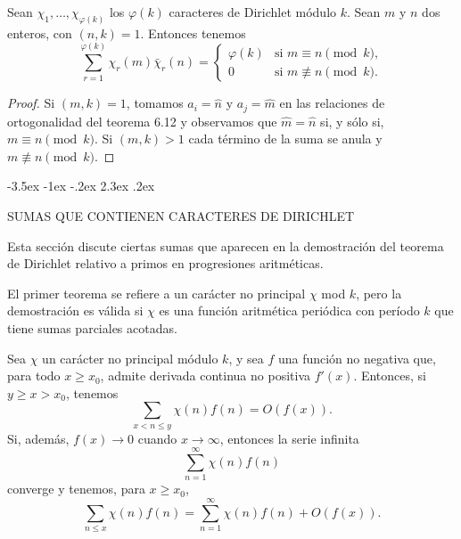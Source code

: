 \documentclass[12pt,a4paper]{book}
\makeatletter
\renewcommand\section{\@startsection{section}{1}{\z@}%
  {-3.5ex \@plus -1ex \@minus -.2ex}%
  {2.3ex \@plus .2ex}%
  {\normalfont\Large\bfseries\raggedright}}
\makeatother
\begin{document}
    \begin{teorema}
        Sean $\chi_{1},\dots,\chi_{\varphi(k)}$ los $\varphi(k)$ caracteres de Dirichlet
        módulo $k$. Sean $m$ y $n$ dos enteros, con $(n,k)=1$. Entonces tenemos
        \begin{equation*}
            \sum_{r=1}^{\varphi(k)}\chi_{r}(m)\bar{\chi}_{r}(n)=
            \begin{cases}
                \varphi(k)&\text{si }m\equiv n\pmod{k},\\
                0&\text{si }m\not\equiv n\pmod{k}.
            \end{cases}
        \end{equation*}
    \end{teorema}

    \begin{proof}
        Si $(m,k)=1$, tomamos $a_{i}=\hat{n}$ y $a_{j}=\hat{m}$ en las relaciones de
        ortogonalidad del teorema 6.12 y observamos que $\hat{m}=\hat{n}$ si, y sólo si,
        $m\equiv n\pmod{k}$. Si $(m,k)>1$ cada término de la suma se anula y
        $m\not\equiv n\pmod{k}$.
    \end{proof}

    \section{SUMAS QUE CONTIENEN CARACTERES DE DIRICHLET}

    Esta sección discute ciertas sumas que aparecen en la demostración del teorema de
    Dirichlet relativo a primos en progresiones aritméticas.

    El primer teorema se refiere a un carácter no principal $\chi$ mod $k$, pero la
    demostración es válida si $\chi$ es una función aritmética periódica con período $k$
    que tiene sumas parciales acotadas.

    \begin{teorema}
        Sea $\chi$ un carácter no principal módulo $k$, y sea $f$ una función no negativa
        que, para todo $x\geq x_{0}$, admite derivada continua no positiva $f'(x)$. Entonces,
        si $y\geq x>x_{0}$, tenemos
        \begin{equation}\label{eq:6-7}
            \sum_{x<n\leq y}\chi(n)f(n)=O(f(x)).
        \end{equation}
        Si, además, $f(x)\to0$ cuando $x\to\infty$, entonces la serie infinita
        \begin{equation*}
            \sum_{n=1}^{\infty}\chi(n)f(n)
        \end{equation*}
        converge y tenemos, para $x\geq x_{0}$,
        \begin{equation}\label{eq:6-8}
            \sum_{n\leq x}\chi(n)f(n)=\sum_{n=1}^{\infty}\chi(n)f(n)+O(f(x)).
        \end{equation}
    \end{teorema}
\end{document}
